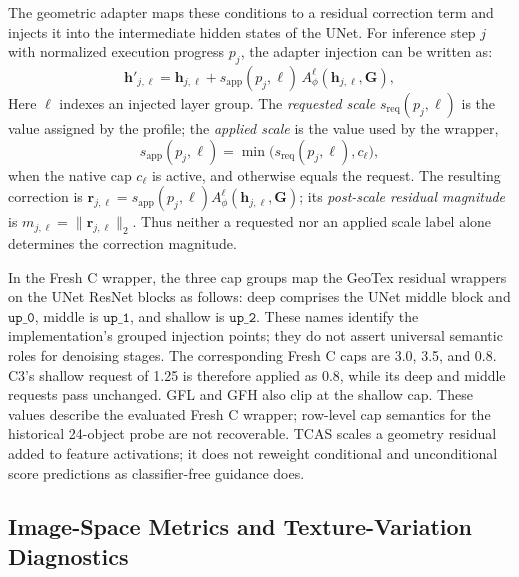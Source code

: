 \documentclass[times,twocolumn,final]{elsarticle}
\begin{document}
The geometric adapter maps these conditions to a residual correction term and injects it into the intermediate hidden states of the UNet. For inference step $j$ with normalized execution progress $p_j$, the adapter injection can be written as:
\begin{equation}
\mathbf{h}'_{j,\ell} = \mathbf{h}_{j,\ell} + s_{\mathrm{app}}(p_j,\ell)\, A^\ell_\phi(\mathbf{h}_{j,\ell}, \mathbf{G}),
\label{eq:injection}
\end{equation}
Here $\ell$ indexes an injected layer group. The \emph{requested scale} $s_{\mathrm{req}}(p_j,\ell)$ is the value assigned by the profile; the \emph{applied scale} is the value used by the wrapper,
\begin{equation}
s_{\mathrm{app}}(p_j,\ell)=\min\!\bigl(s_{\mathrm{req}}(p_j,\ell),c_\ell\bigr),
\end{equation}
when the native cap $c_\ell$ is active, and otherwise equals the request. The resulting correction is $\mathbf{r}_{j,\ell}=s_{\mathrm{app}}(p_j,\ell)A^\ell_\phi(\mathbf{h}_{j,\ell},\mathbf{G})$; its \emph{post-scale residual magnitude} is $m_{j,\ell}=\|\mathbf{r}_{j,\ell}\|_2$. Thus neither a requested nor an applied scale label alone determines the correction magnitude.

In the Fresh C wrapper, the three cap groups map the GeoTex residual wrappers on the UNet ResNet blocks as follows: deep comprises the UNet middle block and $\texttt{up\_0}$, middle is $\texttt{up\_1}$, and shallow is $\texttt{up\_2}$. These names identify the implementation's grouped injection points; they do not assert universal semantic roles for denoising stages. The corresponding Fresh C caps are 3.0, 3.5, and 0.8. C3's shallow request of 1.25 is therefore applied as 0.8, while its deep and middle requests pass unchanged. GFL and GFH also clip at the shallow cap. These values describe the evaluated Fresh C wrapper; row-level cap semantics for the historical 24-object probe are not recoverable. TCAS scales a geometry residual added to feature activations; it does not reweight conditional and unconditional score predictions as classifier-free guidance does.

\subsection{Image-Space Metrics and Texture-Variation Diagnostics}
\label{subsec:metrics}
\end{document}
